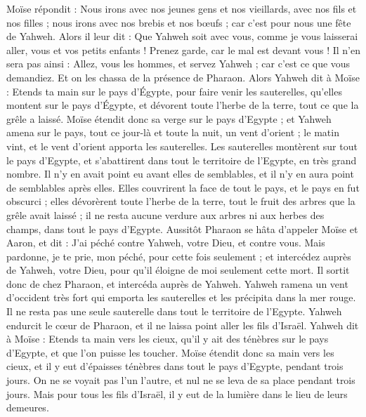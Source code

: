 \begin{multicols}{2}
Moïse répondit : Nous irons avec nos jeunes gens et nos vieillards, avec nos fils et nos filles ; nous irons avec nos brebis et nos bœufs ; car c'est pour nous une fête de Yahweh.
Alors il leur dit : Que Yahweh soit avec vous, comme je vous laisserai aller, vous et vos petits enfants ! Prenez garde, car le mal est devant vous !
Il n'en sera pas ainsi : Allez, vous les hommes, et servez Yahweh ; car c'est ce que vous demandiez. Et on les chassa de la présence de Pharaon.
Alors Yahweh dit à Moïse : Etends ta main sur le pays d'Égypte, pour faire venir les sauterelles, qu'elles montent sur le pays d'Égypte, et dévorent toute l'herbe de la terre, tout ce que la grêle a laissé.
Moïse étendit donc sa verge sur le pays d'Egypte ; et Yahweh amena sur le pays, tout ce jour-là et toute la nuit, un vent d'orient ; le matin vint, et le vent d'orient apporta les sauterelles.
Les sauterelles montèrent sur tout le pays d'Egypte, et s'abattirent dans tout le territoire de l'Egypte, en très grand nombre. Il n'y en avait point eu avant elles de semblables, et il n'y en aura point de semblables après elles.
Elles couvrirent la face de tout le pays, et le pays en fut obscurci ; elles dévorèrent toute l'herbe de la terre, tout le fruit des arbres que la grêle avait laissé ; il ne resta aucune verdure aux arbres ni aux herbes des champs, dans tout le pays d'Egypte.
Aussitôt Pharaon se hâta d'appeler Moïse et Aaron, et dit : J'ai péché contre Yahweh, votre Dieu, et contre vous.
Mais pardonne, je te prie, mon péché, pour cette fois seulement ; et intercédez auprès de Yahweh, votre Dieu, pour qu'il éloigne de moi seulement cette mort.
Il sortit donc de chez Pharaon, et intercéda auprès de Yahweh.
Yahweh ramena un vent d'occident très fort qui emporta les sauterelles et les précipita dans la mer rouge. Il ne resta pas une seule sauterelle dans tout le territoire de l'Egypte.
Yahweh endurcit le cœur de Pharaon, et il ne laissa point aller les fils d'Israël.
Yahweh dit à Moïse : Etends ta main vers les cieux, qu'il y ait des ténèbres sur le pays d'Egypte, et que l’on puisse les toucher.
Moïse étendit donc sa main vers les cieux, et il y eut d'épaisses ténèbres dans tout le pays d'Egypte, pendant trois jours.
On ne se voyait pas l'un l'autre, et nul ne se leva de sa place pendant trois jours. Mais pour tous les fils d'Israël, il y eut de la lumière dans le lieu de leurs demeures.

\end{multicols}
